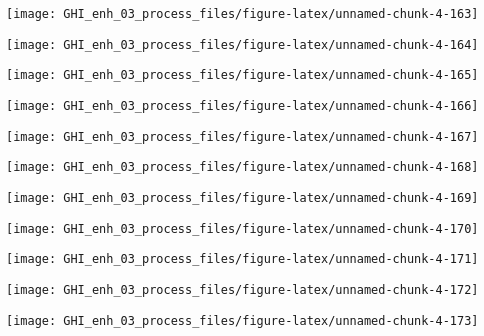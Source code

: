 \documentclass[
  10pt,
  a4paper,oneside]{article}
\begin{document}
\begin{center}\texttt{[image: GHI\_enh\_03\_process\_files/figure-latex/unnamed-chunk-4-163]} \end{center}

\begin{center}\texttt{[image: GHI\_enh\_03\_process\_files/figure-latex/unnamed-chunk-4-164]} \end{center}

\begin{center}\texttt{[image: GHI\_enh\_03\_process\_files/figure-latex/unnamed-chunk-4-165]} \end{center}

\begin{center}\texttt{[image: GHI\_enh\_03\_process\_files/figure-latex/unnamed-chunk-4-166]} \end{center}

\begin{center}\texttt{[image: GHI\_enh\_03\_process\_files/figure-latex/unnamed-chunk-4-167]} \end{center}

\begin{center}\texttt{[image: GHI\_enh\_03\_process\_files/figure-latex/unnamed-chunk-4-168]} \end{center}

\begin{center}\texttt{[image: GHI\_enh\_03\_process\_files/figure-latex/unnamed-chunk-4-169]} \end{center}

\begin{center}\texttt{[image: GHI\_enh\_03\_process\_files/figure-latex/unnamed-chunk-4-170]} \end{center}

\begin{center}\texttt{[image: GHI\_enh\_03\_process\_files/figure-latex/unnamed-chunk-4-171]} \end{center}

\begin{center}\texttt{[image: GHI\_enh\_03\_process\_files/figure-latex/unnamed-chunk-4-172]} \end{center}

\begin{center}\texttt{[image: GHI\_enh\_03\_process\_files/figure-latex/unnamed-chunk-4-173]} \end{center}
\end{document}
